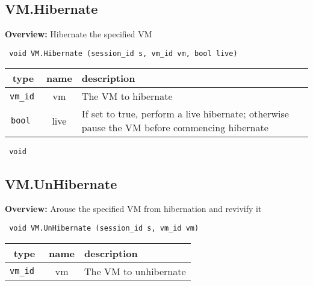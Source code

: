 \subsection{VM.Hibernate}

{\bf Overview:} 
Hibernate the specified VM

\begin{verbatim} void VM.Hibernate (session_id s, vm_id vm, bool live)\end{verbatim}



 
\vspace{0.3cm}
\begin{tabular}{|c|c|p{7cm}|}
 \hline
{\bf type} & {\bf name} & {\bf description} \\ \hline
{\tt vm\_id } & vm & The VM to hibernate \\ \hline 

{\tt bool } & live & If set to true, perform a live hibernate; otherwise pause the VM before commencing hibernate \\ \hline 

\end{tabular}

\vspace{0.3cm}

{\tt 
void
}



\vspace{0.3cm}
\vspace{0.3cm}
\vspace{0.3cm}

\subsection{VM.UnHibernate}

{\bf Overview:} 
Arouse the specified VM from hibernation and revivify it

\begin{verbatim} void VM.UnHibernate (session_id s, vm_id vm)\end{verbatim}



 
\vspace{0.3cm}
\begin{tabular}{|c|c|p{7cm}|}
 \hline
{\bf type} & {\bf name} & {\bf description} \\ \hline
{\tt vm\_id } & vm & The VM to unhibernate \\ \hline 

\end{tabular}

